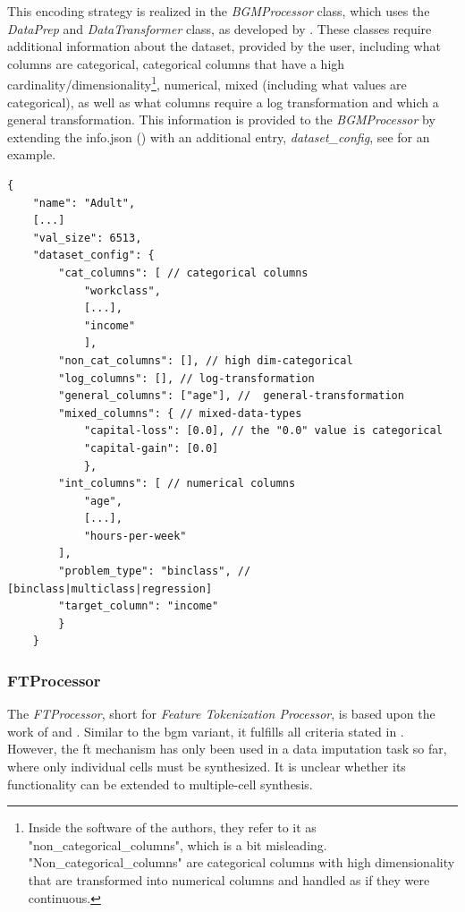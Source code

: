 This encoding strategy is realized in the \textit{BGMProcessor} class, which uses the \textit{DataPrep} and \textit{DataTransformer} class, as developed by \cite{zhao2022CTABGANEnhancingTabular}.
These classes require additional information about the dataset, provided by the user, including what columns are categorical, categorical columns that have a high cardinality/dimensionality\footnote{Inside the software of the authors, they refer to it as "non\_categorical\_columns", which is a bit misleading. "Non\_categorical\_columns" are categorical columns with high dimensionality that are transformed into numerical columns and handled as if they were continuous.},
numerical, mixed (including what values are categorical), as well as what columns require a log transformation and which a general transformation.
This information is provided to the \textit{BGMProcessor} by extending the info.json () with an additional entry, \textit{dataset\_config}, see  for an example.

\begin{lstlisting}[label={lst:info_extended},caption={Example extended data info file from the adult dataset (\Autoref{ch:methods-datasets})}]
    {
    "name": "Adult",
    [...]
    "val_size": 6513,
    "dataset_config": {
        "cat_columns": [ // categorical columns
            "workclass", 
            [...], 
            "income"
            ],
        "non_cat_columns": [], // high dim-categorical
        "log_columns": [], // log-transformation
        "general_columns": ["age"], //  general-transformation             
        "mixed_columns": { // mixed-data-types
            "capital-loss": [0.0], // the "0.0" value is categorical           
            "capital-gain": [0.0]
            },
        "int_columns": [ // numerical columns 
            "age", 
            [...], 
            "hours-per-week"
        ],
        "problem_type": "binclass", // [binclass|multiclass|regression]
        "target_column": "income"
        }
    }
\end{lstlisting}

\subsubsection{FTProcessor}
\label{ch:FTProcessor}

The \textit{FTProcessor}, short for \textit{Feature Tokenization Processor}, is based upon the work of \textcite{zheng2022DiffusionModelsMissing} and \textcite{gorishniy2021RevisitingDeepLearning}.
Similar to the \gls{bgm} variant, it fulfills all criteria stated in .
However, the \gls{ft} mechanism has only been used in a data imputation task so far, where only individual cells must be synthesized.
It is unclear whether its functionality can be extended to multiple-cell synthesis.

